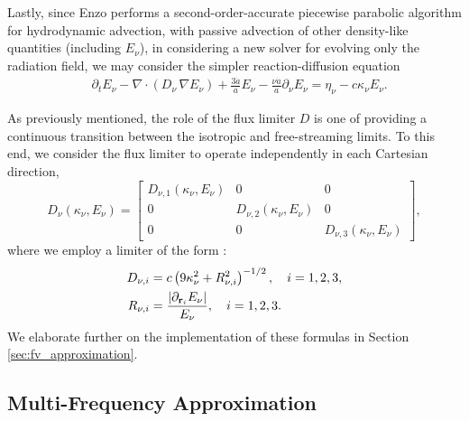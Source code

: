\documentclass[10pt]{article}
\renewcommand{\(}{\left(}
\renewcommand{\)}{\right)}
\newcommand{\rvec}{{\bf r}}
\newcommand{\adot}{\dot{a}}
\newcommand{\Enu}{E_{\nu}}
\begin{document}
Lastly, since Enzo performs a second-order-accurate piecewise
parabolic algorithm for hydrodynamic advection, with passive advection
of other density-like quantities (including $\Enu$), in considering a
new solver for evolving only the radiation field, we may consider the
simpler reaction-diffusion equation
\begin{align}
  \label{eq:mgfld_simplified2}
  &\partial_{t} \Enu - \nabla\cdot(D_{\nu}\,\nabla\Enu) 
      + \frac{3 \adot}{a} \Enu - \frac{\nu \adot}{a}\partial_{\nu}\Enu
    = \eta_{\nu} - c \kappa_{\nu} \Enu.
\end{align}


As previously mentioned, the role of the flux limiter $D$ is one of
providing a continuous transition between the isotropic and
free-streaming limits.  To this end, we consider the flux limiter to
operate independently in each Cartesian direction,
\[
   D_{\nu}(\kappa_{\nu},\Enu) = \left[\begin{array}{ccc} 
       D_{\nu,1}(\kappa_{\nu},\Enu) & 0 & 0 \\
       0 & D_{\nu,2}(\kappa_{\nu},\Enu) & 0 \\
       0 & 0 & D_{\nu,3}(\kappa_{\nu},\Enu) 
     \end{array}\right],
\]
where we employ a limiter of the form  \cite{Morel2000}: 
\begin{align}
  \label{eq:Morel_limiterD}
  D_{\nu,i} &= c \left(9\kappa_{\nu}^2 + R_{\nu,i}^2\right)^{-1/2}, \quad i=1,2,3,\\
  \label{eq:Morel_limiterR}
  R_{\nu,i} &= \frac{|\partial_{\rvec_i}\Enu|}{\Enu}, \quad i=1,2,3.
\end{align}
We elaborate further on the implementation of these formulas in
Section \ref{sec:fv_approximation}.







\subsection{Multi-Frequency Approximation}
\label{subsec:multi_frequency}
\end{document}
